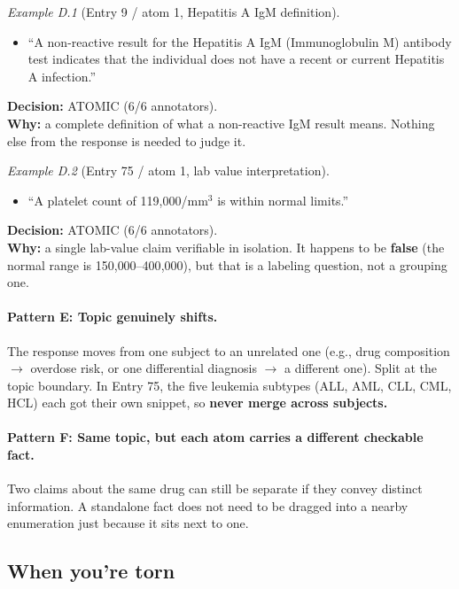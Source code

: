 \documentclass{article}
\begin{document}
\medskip
\noindent\textit{Example D.1} (Entry 9 / atom 1, Hepatitis A IgM definition).
\begin{itemize}[leftmargin=1.8em,labelsep=0.5em,itemsep=2pt,topsep=3pt]
    \item[\textit{atom 1:}] ``A non-reactive result for the Hepatitis A IgM (Immunoglobulin M) antibody test indicates that the individual does not have a recent or current Hepatitis A infection.''
\end{itemize}
\noindent\textbf{Decision:} ATOMIC (6/6 annotators). \\
\noindent\textbf{Why:} a complete definition of what a non-reactive IgM result means. Nothing else from the response is needed to judge it.

\medskip
\noindent\textit{Example D.2} (Entry 75 / atom 1, lab value interpretation).
\begin{itemize}[leftmargin=1.8em,labelsep=0.5em,itemsep=2pt,topsep=3pt]
    \item[\textit{atom 1:}] ``A platelet count of 119{,}000/mm$^3$ is within normal limits.''
\end{itemize}
\noindent\textbf{Decision:} ATOMIC (6/6 annotators). \\
\noindent\textbf{Why:} a single lab-value claim verifiable in isolation. It happens to be \textbf{false} (the normal range is 150{,}000--400{,}000), but that is a labeling question, not a grouping one.

\paragraph{Pattern E: Topic genuinely shifts.}
The response moves from one subject to an unrelated one (e.g., drug composition $\rightarrow$ overdose risk, or one differential diagnosis $\rightarrow$ a different one). Split at the topic boundary. In Entry 75, the five leukemia subtypes (ALL, AML, CLL, CML, HCL) each got their own snippet, so \textbf{never merge across subjects.}

\paragraph{Pattern F: Same topic, but each atom carries a different checkable fact.}
Two claims about the same drug can still be separate if they convey distinct information. A standalone fact does not need to be dragged into a nearby enumeration just because it sits next to one.

\subsection{When you're torn}
\end{document}
